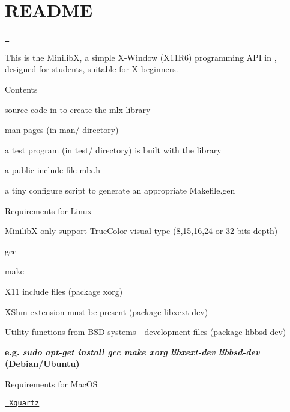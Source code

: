 \chapter{README}
\hypertarget{md__2_users_2thibault_2kdrive_21-_p_r_o_j_e_c_t_s_2_p-42_2mini_r_t_2mini_r_t__example_2lib_2mlx__linux_2_r_e_a_d_m_e}{}\label{md__2_users_2thibault_2kdrive_21-_p_r_o_j_e_c_t_s_2_p-42_2mini_r_t_2mini_r_t__example_2lib_2mlx__linux_2_r_e_a_d_m_e}
\href{https://github.com/42Paris/minilibx-linux/actions/workflows/ci.yml}{\texttt{ }}

This is the MinilibX, a simple X-\/\+Window (X11\+R6) programming API in , designed for students, suitable for X-\/beginners.

Contents


\begin{DoxyItemize}
\item source code in  to create the mlx library
\item man pages (in man/ directory)
\item a test program (in test/ directory) is built with the library
\item a public include file mlx.\+h
\item a tiny configure script to generate an appropriate Makefile.\+gen
\end{DoxyItemize}

Requirements for Linux


\begin{DoxyItemize}
\item MinilibX only support True\+Color visual type (8,15,16,24 or 32 bits depth)
\item gcc
\item make
\item X11 include files (package xorg)
\item XShm extension must be present (package libxext-\/dev)
\item Utility functions from BSD systems -\/ development files (package libbsd-\/dev)
\item {\bfseries{e.\+g. {\itshape sudo apt-\/get install gcc make xorg libxext-\/dev libbsd-\/dev} (Debian/\+Ubuntu)}}
\end{DoxyItemize}

Requirements for Mac\+OS
\begin{DoxyItemize}
\item \href{https://www.xquartz.org/}{\texttt{ Xquartz}}
\end{DoxyItemize}


